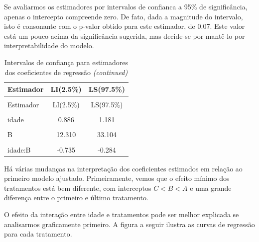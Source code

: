 \documentclass[
  letterpaper,
  DIV=11,
  numbers=noendperiod]{scrartcl}
\begin{document}
Se avaliarmos os estimadores por intervalos de confianca a 95\% de
significância, apenas o intercepto compreende zero. De fato, dada a
magnitude do intervalo, isto é consonante com o p-valor obtido para este
estimador, de 0.07. Este valor está um pouco acima da significância
sugerida, mas decide-se por mantê-lo por interpretabilidade do modelo.

\begin{longtable}[t]{lcc}
\caption{Intervalos de confiança para estimadores dos coeficientes de regressão}\\
\toprule
Estimador & LI(2.5\%) & LS(97.5\%)\\
\midrule
\endfirsthead
\caption[]{Intervalos de confiança para estimadores dos coeficientes de regressão \textit{(continued)}}\\
\toprule
Estimador & LI(2.5\%) & LS(97.5\%)\\
\midrule
\endhead

\endfoot
\bottomrule
\endlastfoot
\cellcolor{gray!15}{(Intercept)} & \cellcolor{gray!15}{-0.630} & \cellcolor{gray!15}{13.052}\\
idade & 0.886 & 1.181\\
\cellcolor{gray!15}{A} & \cellcolor{gray!15}{30.920} & \cellcolor{gray!15}{51.688}\\
B & 12.310 & 33.104\\
\cellcolor{gray!15}{idade:A} & \cellcolor{gray!15}{-0.925} & \cellcolor{gray!15}{-0.480}\\
idade:B & -0.735 & -0.284\\*
\end{longtable}

Há várias mudanças na interpretação dos coeficientes estimados em
relação ao primeiro modelo ajustado. Primeiramente, vemos que o efeito
mínimo dos tratamentos está bem diferente, com interceptos \(C<B<A\) e
uma grande diferença entre o primeiro e último tratamento.

O efeito da interação entre idade e tratamentos pode ser melhor
explicada se analisarmos graficamente primeiro. A figura a seguir
ilustra as curvas de regressão para cada tratamento.

\newpage{}
\end{document}
